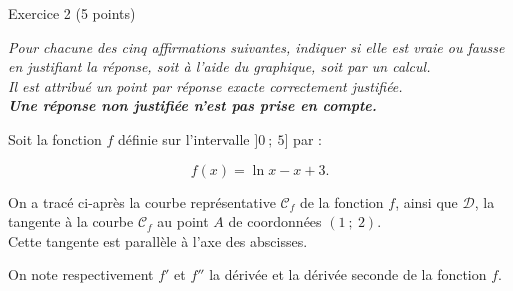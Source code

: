 
%
\begin{h2}Exercice 2 (5 points)\end{h2}
\par
\emph{Pour chacune des cinq affirmations suivantes, indiquer si elle est vraie ou fausse en justifiant la réponse, soit à l'aide du graphique, soit par un calcul.\\ Il est attribué un point par réponse exacte correctement justifiée.\\ \textbf{Une réponse non justifiée n'est pas prise en compte.}}
\par
Soit la fonction $f$ définie sur l'intervalle $]0~;~5]$ par :
\par
\[f(x) =  \ln x - x + 3.  \]
\par
On a tracé ci-après la courbe représentative $\mathscr{C}_f$ de la fonction $f$, ainsi que $\mathscr{D}$, la tangente à la courbe $\mathscr{C}_f$ au point $A$ de coordonnées $(1~;~2)$.\\ Cette tangente est parallèle à l'axe des abscisses.
\par
On note respectivement $f'$ et $f''$ la dérivée et la dérivée seconde de la fonction $f$.
\par

